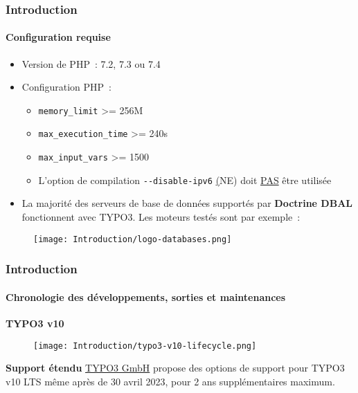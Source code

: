 \begin{frame}[fragile]
	\frametitle{Introduction}
	\framesubtitle{Configuration requise}

	\begin{itemize}
		\item Version de PHP~: 7.2, 7.3 ou 7.4
		\item Configuration PHP~:

			\begin{itemize}
				\item \texttt{memory\_limit} >= 256M
				\item \texttt{max\_execution\_time} >= 240s
				\item \texttt{max\_input\_vars} >= 1500
				\item L'option de compilation \texttt{-}\texttt{-disable-ipv6}
					\underline(NE) doit \underline{PAS} être utilisée
			\end{itemize}

		\item La majorité des serveurs de base de données supportés par \textbf{Doctrine DBAL}
			fonctionnent avec TYPO3. Les moteurs testés sont par exemple~:
	\end{itemize}

	\begin{figure}
		\texttt{[image: Introduction/logo-databases.png]}
	\end{figure}

\end{frame}


\begin{frame}[fragile]
	\frametitle{Introduction}
	\framesubtitle{Chronologie des développements, sorties et maintenances}

	\textbf{TYPO3 v10}

	\begin{figure}
		\texttt{[image: Introduction/typo3-v10-lifecycle.png]}
	\end{figure}

	\textbf{Support étendu}\newline
	\smaller
		\href{https://typo3.com}{TYPO3 GmbH} propose des options de support pour TYPO3
		v10 LTS même après de 30 avril 2023, pour 2 ans supplémentaires maximum.
	\normalsize

\end{frame}

